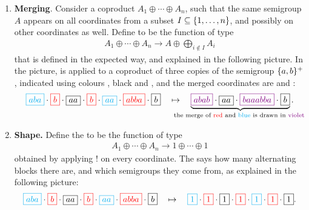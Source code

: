 \begin{enumerate}
    \item \AP \textbf{Merging}. Consider a coproduct $A_1 \oplus \cdots \oplus A_n$, such that the same semigroup $A$ appears on all coordinates from a subset $I \subseteq \{1,\ldots,n\}$, and possibly on other coordinates as well. Define  to be the function of type 
    \begin{align*}
        A_1 \oplus \cdots \oplus A_n \to  A \oplus \bigoplus_{i \not \in I} A_i
        \end{align*}
    that is defined in the expected way, and explained in the following picture. In the picture,  is applied to a coproduct of three copies of the semigroup $\{a,b\}^+$, indicated using colours , black and , and the merged coordinates are  and :
        \begin{align*}
        \blue{\boxed{aba}} \cdot 
        \red{\boxed{b}} \cdot 
        \boxed{aa} \cdot 
        \red{\boxed{b}} \cdot 
        \blue{\boxed{aa}} \cdot 
        \red{\boxed{abba}} \cdot 
        \boxed{b}
        \quad \mapsto \quad  
        \myunderbrace{
            \violet{\boxed{abab}} \cdot 
        \boxed{aa} \cdot 
        \violet{\boxed{baaabba}} \cdot 
        \boxed{b}
        }{the merge of \red{red} and \blue{blue} is drawn in \violet{violet}}.\end{align*}    
        \item \AP \textbf {Shape.}  Define the  to be the function of type 
        \begin{align*}
        A_1 \oplus \cdots \oplus A_n \to 1 \oplus \cdots \oplus 1
        \end{align*}
        obtained by applying $!$ on every coordinate. The  says how many alternating blocks there are, and which semigroups they come from, as explained in the following picture:
        \begin{align*}
            {\color{cyan}\boxed{aba}} \cdot 
            {\color{red}\boxed{b}} \cdot 
            \boxed{aa} \cdot 
            {\color{red}\boxed{b}} \cdot 
            {\color{cyan}\boxed{aa}} \cdot 
            {\color{red}\boxed{abba}} \cdot 
            \boxed{b}
            \quad \mapsto \quad  
            {\color{cyan}\boxed{1}} \cdot 
            {\color{red}\boxed{1}} \cdot 
            \boxed{1} \cdot 
            {\color{red}\boxed{1}} \cdot 
            {\color{cyan}\boxed{1}} \cdot 
            {\color{red}\boxed{1}} \cdot 
            \boxed{1}.
        \end{align*}

\end{enumerate}
